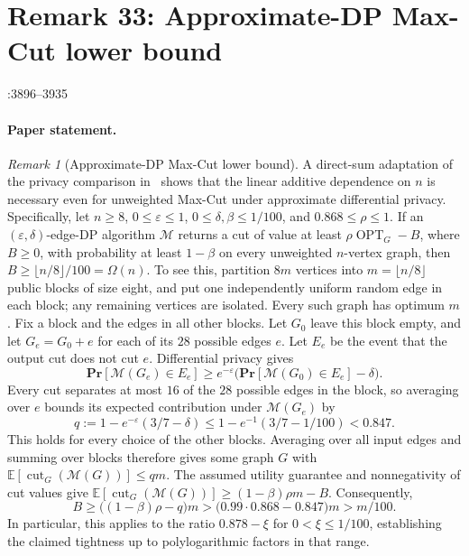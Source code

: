 \documentclass[a4paper,10pt]{article}
\theoremstyle{definition}
\theoremstyle{remark}
\newtheorem{remark}[theorem]{Remark}
\newcommand{\E}{\mathbb{E}}
\newcommand{\Prb}{\mathbf{Pr}}
\newcommand{\SourceId}[1]{\texttt{\detokenize{#1}}}
\begin{document}
\section{Remark 33: Approximate-DP Max-Cut lower bound}
\SourceId{rem:maxcut-tightness}\hfill\SourceId{STOC2027.tex}:3896--3935
\paragraph{Paper statement.}
\setcounter{theorem}{32}
\begin{remark}[Approximate-DP Max-Cut lower bound]\label{rem:maxcut-tightness}
A direct-sum adaptation of the privacy comparison in~\cite{dharangutte2026price}
shows that the linear additive dependence on $n$ is necessary even for unweighted
Max-Cut under approximate differential privacy. Specifically, let $n\geq8$, $0\leq\varepsilon\leq1$,
$0\leq\delta,\beta\leq1/100$, and $0.868\leq\rho\leq1$.
If an $(\varepsilon,\delta)$-edge-DP algorithm $\mathcal M$ returns a cut of value
at least $\rho\operatorname{OPT}_G-B$, where $B\geq0$, with probability at least
$1-\beta$ on every unweighted $n$-vertex graph, then
$B\geq\lfloor n/8\rfloor/100=\Omega(n)$.
To see this, partition $8m$ vertices into $m=\lfloor n/8\rfloor$ public blocks
of size eight, and put one independently uniform random edge in each block;
any remaining vertices are isolated. Every such graph has optimum $m$.
Fix a block and the edges in all other blocks. Let $G_0$ leave this block empty,
and let $G_e=G_0+e$ for each of its $28$ possible edges $e$.
Let $E_e$ be the event that the output cut does not cut $e$.
Differential privacy gives
\[
 \Prb[\mathcal M(G_e)\in E_e]
 \geq e^{-\varepsilon}\bigl(\Prb[\mathcal M(G_0)\in E_e]-\delta\bigr).
\]
Every cut separates at most $16$ of the $28$ possible edges in the block, so
averaging over $e$ bounds its expected contribution under $\mathcal M(G_e)$ by
\[
 q:=1-e^{-\varepsilon}(3/7-\delta)
 \leq1-e^{-1}(3/7-1/100)<0.847.
\]
This holds for every choice of the other blocks. Averaging over all input edges
and summing over blocks therefore gives some graph $G$ with
$\E[\operatorname{cut}_G(\mathcal M(G))]\leq qm$.
The assumed utility guarantee and nonnegativity of cut values give
$\E[\operatorname{cut}_G(\mathcal M(G))]\geq(1-\beta)\rho m-B$.
Consequently,
\[
 B\geq\bigl((1-\beta)\rho-q\bigr)m
 >\bigl(0.99\cdot0.868-0.847\bigr)m>m/100.
\]
In particular, this applies to the ratio $0.878-\xi$ for $0<\xi\leq1/100$,
establishing the claimed tightness up to polylogarithmic factors in that range.
\end{remark}
\end{document}
